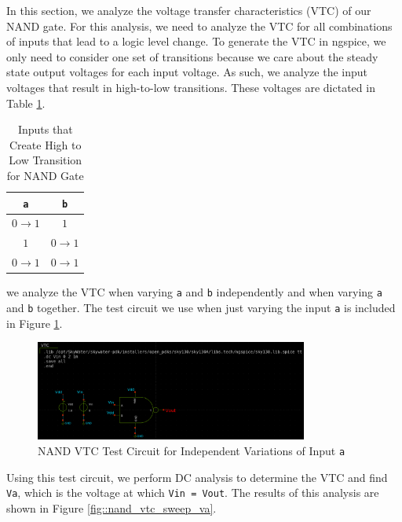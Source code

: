 \documentclass[fleqn]{article}
\begin{document}
	In this section, we analyze the voltage transfer characteristics (VTC) of our NAND gate. For this analysis, we need to analyze the VTC for all combinations of inputs that lead to a logic level change. To generate the VTC in ngspice, we only need to consider one set of transitions because we care about the steady state output voltages for each input voltage. As such, we analyze the input voltages that result in high-to-low transitions. These voltages are dictated in Table \ref{table::nand_gate_high_to_low_transitions}.
	
	\begin{table}[H]
	\begin{center}
	\caption{Inputs that Create High to Low Transition for NAND Gate}
	\label{table::nand_gate_high_to_low_transitions}
	\begin{tabular}{| c | c |}
		\hline
		\texttt{a} & \texttt{b} \\
		\hline	
		$0 \rightarrow 1$ & $1$\\
		\hline	
		$1$ & $0 \rightarrow 1$\\
		\hline	
		$0 \rightarrow 1$ & $0 \rightarrow 1$\\
		\hline
	\end{tabular}
	\end{center}
	\end{table}
	
	we analyze the VTC when varying \texttt{a} and \texttt{b} independently and when varying \texttt{a} and \texttt{b} together. The test circuit we use when just varying the input \texttt{a} is included in Figure \ref{fig::nand_vtc_test_sweep_va}.
	
	
	
	\begin{figure}[H]
		\centerline{\includegraphics[width=0.8\textwidth]{nand_vtc_test_sweep_va.png}}
		\caption{NAND VTC Test Circuit for Independent Variations of Input \texttt{a}}
		\label{fig::nand_vtc_test_sweep_va}
	\end{figure}
	
	Using this test circuit, we perform DC analysis to determine the VTC and find \texttt{Va}, which is the voltage at which \texttt{Vin = Vout}. The results of this analysis are shown in Figure \ref{fig::nand_vtc_sweep_va}.
	
\end{document}
